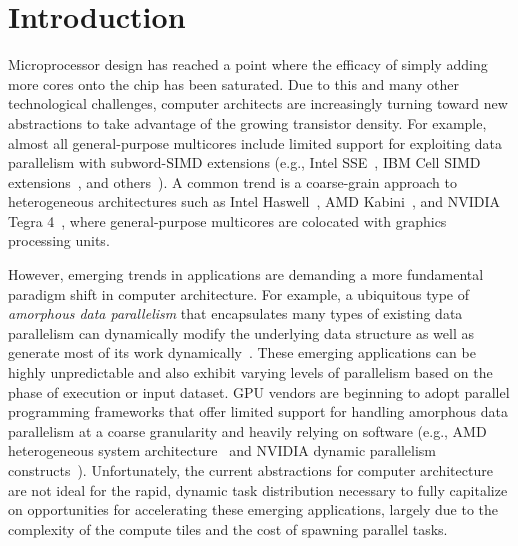 
\section{Introduction}
\label{sec-intro}

\begin{figure}[b]
  \begin{minipage}[b]{0.42\tw}
    
  \end{minipage}%
  \hfill%
  \begin{minipage}[b]{0.56\tw}
    
  \end{minipage}
\end{figure}

Microprocessor design has reached a point where the efficacy of simply
adding more cores onto the chip has been saturated. Due to this and many
other technological challenges, computer architects are increasingly
turning toward new abstractions to take advantage of the growing
transistor density. For example, almost all general-purpose multicores include
limited support for exploiting data parallelism with subword-SIMD
extensions (e.g., Intel SSE~\cite{intel-sse4-manual2007}, IBM Cell SIMD
extensions~\cite{gschwind-ibm-cell-ieeemicro2006}, and
others~\cite{slingerland-simd-survey-ucbtr2000}). A common trend is a
coarse-grain approach to heterogeneous architectures such as Intel
Haswell~\cite{hammarlund-intel-haswell-ieeemicro2014}, AMD
Kabini~\cite{bouvier-amd-kabini-ieeemicro2014}, and NVIDIA Tegra
4~\cite{krewell-nvidia-tegra4-mpr2013}, where general-purpose multicores
are colocated with graphics processing units.

However, emerging trends in applications are demanding a more fundamental
paradigm shift in computer architecture. For example, a ubiquitous type
of \emph{amorphous data parallelism} that encapsulates many types of existing
data parallelism can dynamically modify the underlying data structure as
well as generate most of its work
dynamically~\cite{pingali-tao-pldi2011}. These emerging applications can
be highly unpredictable and also exhibit varying levels of parallelism
based on the phase of execution or input dataset.
GPU vendors are beginning to adopt parallel programming frameworks that
offer limited support for handling amorphous data parallelism at a coarse
granularity and heavily relying on software (e.g., AMD heterogeneous
system architecture~\cite{amd-hsa-wpaper2012} and NVIDIA dynamic
parallelism
constructs~\cite{nvidia-dynamic-parallelism-wpaper2012}). Unfortunately,
the current abstractions for computer architecture are not ideal for the
rapid, dynamic task distribution necessary to fully capitalize on
opportunities for accelerating these emerging applications, largely due
to the complexity of the compute tiles and the cost of spawning parallel
tasks.

